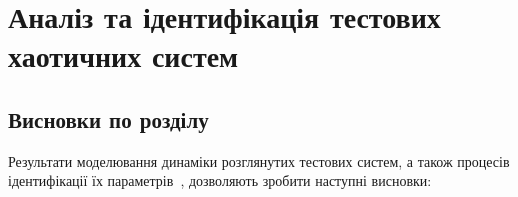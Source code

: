 \chapter{Аналіз та ідентифікація тестових хаотичних систем}
\label{atu:ch:testsys}















\section{Висновки по розділу \thechapter} %

Результати моделювання динаміки розглянутих тестових систем,
а також процесів ідентифікації їх параметрів~\cite{atu_colmono2016},
дозволяють зробити наступні висновки:

